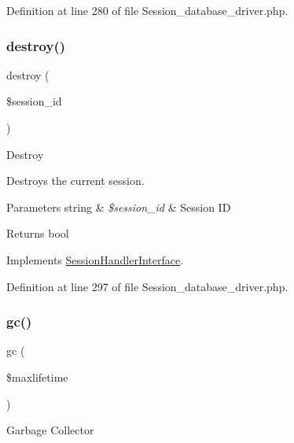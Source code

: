 Definition at line 280 of file Session\+\_\+database\+\_\+driver.\+php.

\mbox{\label{class_c_i___session__database__driver_aaec5812f6b4eb6835f88d3baa06a002a}} 
\subsubsection{\texorpdfstring{destroy()}{destroy()}}
{\footnotesize\ttfamily destroy (\begin{DoxyParamCaption}\item[{}]{\$session\+\_\+id }\end{DoxyParamCaption})}

Destroy

Destroys the current session.


\begin{DoxyParams}[1]{Parameters}
string & {\em \$session\+\_\+id} & Session ID \\
\hline
\end{DoxyParams}
\begin{DoxyReturn}{Returns}
bool 
\end{DoxyReturn}


Implements \mbox{\hyperlink{interface_session_handler_interface_aaec5812f6b4eb6835f88d3baa06a002a}{Session\+Handler\+Interface}}.



Definition at line 297 of file Session\+\_\+database\+\_\+driver.\+php.

\mbox{\label{class_c_i___session__database__driver_a57aff7ee0656d8aa75d545fb8b3ae35d}} 
\subsubsection{\texorpdfstring{gc()}{gc()}}
{\footnotesize\ttfamily gc (\begin{DoxyParamCaption}\item[{}]{\$maxlifetime }\end{DoxyParamCaption})}

Garbage Collector

